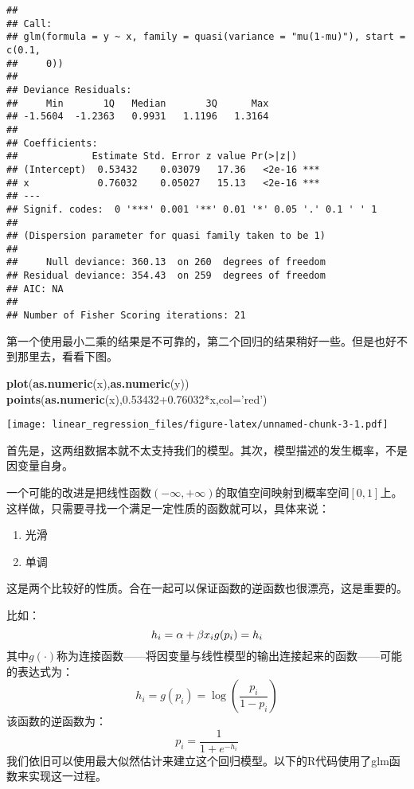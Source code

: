 \documentclass[]{ctexart}
\newenvironment{Shaded}{\begin{snugshade}}{\end{snugshade}}
\newcommand{\KeywordTok}[1]{\textcolor[rgb]{0.13,0.29,0.53}{\textbf{{#1}}}}
\newcommand{\DataTypeTok}[1]{\textcolor[rgb]{0.13,0.29,0.53}{{#1}}}
\newcommand{\FloatTok}[1]{\textcolor[rgb]{0.00,0.00,0.81}{{#1}}}
\newcommand{\StringTok}[1]{\textcolor[rgb]{0.31,0.60,0.02}{{#1}}}
\newcommand{\NormalTok}[1]{{#1}}
\providecommand{\tightlist}{%
  \setlength{\itemsep}{0pt}\setlength{\parskip}{0pt}}
\begin{document}
\begin{verbatim}
## 
## Call:
## glm(formula = y ~ x, family = quasi(variance = "mu(1-mu)"), start = c(0.1, 
##     0))
## 
## Deviance Residuals: 
##     Min       1Q   Median       3Q      Max  
## -1.5604  -1.2363   0.9931   1.1196   1.3164  
## 
## Coefficients:
##             Estimate Std. Error z value Pr(>|z|)    
## (Intercept)  0.53432    0.03079   17.36   <2e-16 ***
## x            0.76032    0.05027   15.13   <2e-16 ***
## ---
## Signif. codes:  0 '***' 0.001 '**' 0.01 '*' 0.05 '.' 0.1 ' ' 1
## 
## (Dispersion parameter for quasi family taken to be 1)
## 
##     Null deviance: 360.13  on 260  degrees of freedom
## Residual deviance: 354.43  on 259  degrees of freedom
## AIC: NA
## 
## Number of Fisher Scoring iterations: 21
\end{verbatim}

第一个使用最小二乘的结果是不可靠的，第二个回归的结果稍好一些。但是也好不到那里去，看看下图。

\begin{Shaded}
\begin{Highlighting}[]
\KeywordTok{plot}\NormalTok{(}\KeywordTok{as.numeric}\NormalTok{(x),}\KeywordTok{as.numeric}\NormalTok{(y))}
\KeywordTok{points}\NormalTok{(}\KeywordTok{as.numeric}\NormalTok{(x),}\FloatTok{0.53432+0.76032}\NormalTok{*x,}\DataTypeTok{col=}\StringTok{'red'}\NormalTok{)}
\end{Highlighting}
\end{Shaded}

\texttt{[image: linear\_regression\_files/figure-latex/unnamed-chunk-3-1.pdf]}

首先是，这两组数据本就不太支持我们的模型。其次，模型描述的发生概率，不是因变量自身。

一个可能的改进是把线性函数\((-\infty,+\infty)\)的取值空间映射到概率空间\([0,1]\)上。这样做，只需要寻找一个满足一定性质的函数就可以，具体来说：

\begin{enumerate}
\def\labelenumi{\arabic{enumi}.}
\tightlist
\item
  光滑
\item
  单调
\end{enumerate}

这是两个比较好的性质。合在一起可以保证函数的逆函数也很漂亮，这是重要的。

比如： \[
h_i = \alpha + \beta x_i \\
g(p_i)=h_i
\]
其中\(g(\cdot)\)称为连接函数------将因变量与线性模型的输出连接起来的函数------可能的表达式为：
\[
h_i=g(p_i)=\log(\frac{p_i}{1-p_i})
\] 该函数的逆函数为： \[
p_i = \frac{1}{1+e^{-h_i}}
\]
我们依旧可以使用最大似然估计来建立这个回归模型。以下的R代码使用了glm函数来实现这一过程。
\end{document}
